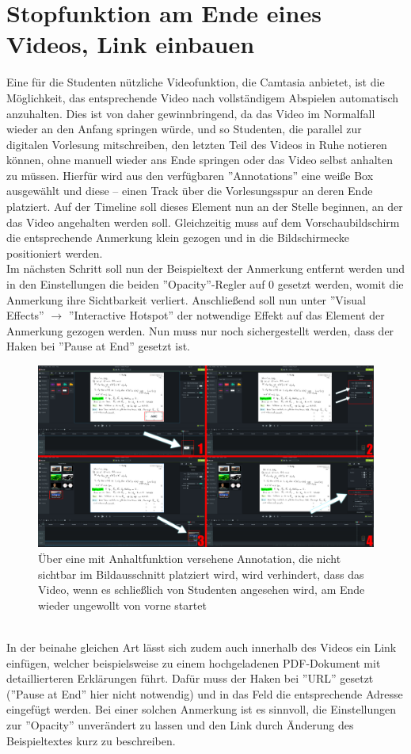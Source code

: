 \documentclass{scrreprt}
\begin{document}
\section{Stopfunktion am Ende eines Videos, Link einbauen}
Eine für die Studenten nützliche Videofunktion, die Camtasia anbietet, ist die Möglichkeit, das entsprechende Video nach vollständigem Abspielen automatisch anzuhalten. Dies ist von daher gewinnbringend, da das Video im Normalfall wieder an den Anfang springen würde, und so Studenten, die parallel zur digitalen Vorlesung mitschreiben, den letzten Teil des Videos in Ruhe notieren können, ohne manuell wieder ans Ende springen oder das Video selbst anhalten zu müssen. Hierfür wird aus den verfügbaren ''Annotations'' eine weiße Box ausgewählt und diese -- einen Track über die Vorlesungsspur an deren Ende platziert. Auf der Timeline soll dieses Element nun an der Stelle beginnen, an der das Video angehalten werden soll. Gleichzeitig muss auf dem Vorschaubildschirm die entsprechende Anmerkung klein gezogen und in die Bildschirmecke positioniert werden.
\pagebreak\\
Im nächsten Schritt soll nun der Beispieltext der Anmerkung entfernt werden und in den Einstellungen die beiden ''Opacity''-Regler auf 0 gesetzt werden, womit die Anmerkung ihre Sichtbarkeit verliert. Anschließend soll nun unter ''Visual Effects'' $\rightarrow$ ''Interactive Hotspot'' der notwendige Effekt auf das Element der Anmerkung gezogen werden. Nun muss nur noch sichergestellt werden, dass der Haken bei ''Pause at End'' gesetzt ist.
\\
\begin{figure}[h]
    \centering
    \includegraphics[width=1\textwidth]{endvideo.png}
    \caption{Über eine mit Anhaltfunktion versehene Annotation, die nicht sichtbar im Bildausschnitt platziert wird, wird verhindert, dass das Video, wenn es schließlich von Studenten angesehen wird, am Ende wieder ungewollt von vorne startet}
    \label{fig:endvideo}
\end{figure}
\\
In der beinahe gleichen Art lässt sich zudem auch innerhalb des Videos ein Link einfügen, welcher beispielsweise zu einem hochgeladenen PDF-Dokument mit detaillierteren Erklärungen führt. Dafür muss der Haken bei ''URL'' gesetzt (''Pause at End'' hier nicht notwendig) und in das Feld die entsprechende Adresse eingefügt werden. Bei einer solchen Anmerkung ist es sinnvoll, die Einstellungen zur ''Opacity'' unverändert zu lassen und den Link durch Änderung des Beispieltextes kurz zu beschreiben.
\pagebreak 
\end{document}
